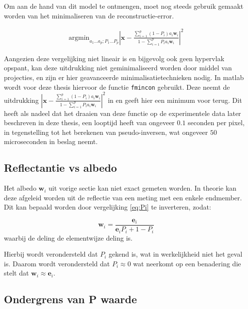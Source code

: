 \documentclass[12pt]{report}
\begin{document}
Om aan de hand van dit model te ontmengen, moet nog steeds gebruik gemaakt worden van het minimaliseren van de reconstructie-error. 

\begin{align}
\text{argmin}_{a_1 ... a_p; P_1 ... P_p} \left| \bm{x} - \frac{\sum_{i=1}^p (1-P_i) a_{i} \bm{w}_{i}}{1-\sum_{i=1}^p P_i a_{i} \bm{w}_{i}} \right|^2
\end{align}

Aangezien deze vergelijking niet lineair is en bijgevolg ook geen hypervlak opspant, kan deze uitdrukking niet geminimaliseerd worden door middel van projecties, en zijn er hier geavanceerde minimalisatietechnieken nodig. In matlab\cite{MATLAB} wordt voor deze thesis hiervoor de functie \texttt{fmincon} gebruikt. Deze neemt de uitdrukking $\left| \bm{x} - \frac{\sum_{i=1}^p (1-P_i) a_{i} \bm{w}_{i}}{1-\sum_{i=1}^p P_i a_{i} \bm{w}_{i}} \right|^2$ in en geeft hier een minimum voor terug. Dit heeft als nadeel dat het draaien van deze functie op de experimentele data later beschreven in deze thesis, een looptijd heeft van ongeveer $0.1$ seconden per pixel, in tegenstelling tot het berekenen van pseudo-inversen, wat ongeveer $50$ microseconden in beslag neemt. 

\subsection{Reflectantie vs albedo}

Het albedo $\bm{w}_i$ uit vorige sectie kan niet exact gemeten worden. In theorie kan deze afgeleid worden uit de reflectie van een meting met een enkele endmember. Dit kan bepaald worden door vergelijking \ref{eq:Pi} te inverteren, zodat:

\begin{equation}
\bm{w}_i = \frac{\bm{e}_i}{\bm{e}_iP_i + 1 - P_i}
\end{equation}
waarbij de deling de elementwijze deling is. 

Hierbij wordt verondersteld dat $P_i$ gekend is, wat in werkelijkheid niet het geval is. Daarom wordt verondersteld dat $P_i \approx 0$ wat neerkomt op een benadering die stelt dat $\bm{w}_i \approx \bm{e}_i$. 

\subsection{Ondergrens van P waarde}
\end{document}
